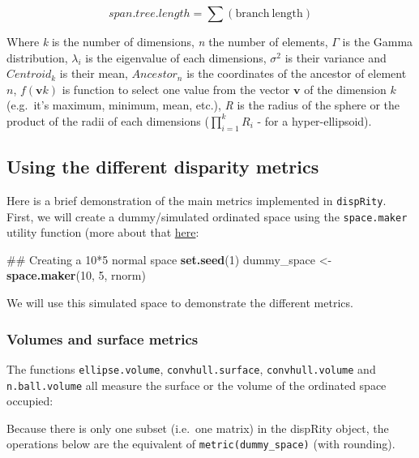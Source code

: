\documentclass[]{book}
\newenvironment{Shaded}{\begin{snugshade}}{\end{snugshade}}
\newcommand{\KeywordTok}[1]{\textcolor[rgb]{0.13,0.29,0.53}{\textbf{#1}}}
\newcommand{\DecValTok}[1]{\textcolor[rgb]{0.00,0.00,0.81}{#1}}
\newcommand{\StringTok}[1]{\textcolor[rgb]{0.31,0.60,0.02}{#1}}
\newcommand{\NormalTok}[1]{#1}
\theoremstyle{definition}
\theoremstyle{definition}
\theoremstyle{definition}
\theoremstyle{remark}
\begin{document}
\begin{equation}
    span.tree.length = \sum(\mathrm{branch\ length})
\end{equation}

Where \emph{k} is the number of dimensions, \emph{n} the number of
elements, \(\Gamma\) is the Gamma distribution, \(\lambda_i\) is the
eigenvalue of each dimensions, \(\sigma^{2}\) is their variance and
\(Centroid_{k}\) is their mean, \(Ancestor_{n}\) is the coordinates of
the ancestor of element \(n\), \(f(\mathbf{v}k)\) is function to select
one value from the vector \(\mathbf{v}\) of the dimension \(k\)
(e.g.~it's maximum, minimum, mean, etc.), \emph{R} is the radius of the
sphere or the product of the radii of each dimensions
(\(\displaystyle\prod_{i=1}^{k}R_{i}\) - for a hyper-ellipsoid).

\subsection{Using the different disparity
metrics}\label{using-the-different-disparity-metrics}

Here is a brief demonstration of the main metrics implemented in
\texttt{dispRity}. First, we will create a dummy/simulated ordinated
space using the \texttt{space.maker} utility function (more about that
\protect\hyperlink{space.maker}{here}:

\begin{Shaded}
\begin{Highlighting}[]
\NormalTok{## Creating a 10*5 normal space}
\KeywordTok{set.seed}\NormalTok{(}\DecValTok{1}\NormalTok{)}
\NormalTok{dummy_space <-}\StringTok{ }\KeywordTok{space.maker}\NormalTok{(}\DecValTok{10}\NormalTok{, }\DecValTok{5}\NormalTok{, rnorm)}
\end{Highlighting}
\end{Shaded}

We will use this simulated space to demonstrate the different metrics.

\subsubsection{Volumes and surface
metrics}\label{volumes-and-surface-metrics}

The functions \texttt{ellipse.volume}, \texttt{convhull.surface},
\texttt{convhull.volume} and \texttt{n.ball.volume} all measure the
surface or the volume of the ordinated space occupied:

Because there is only one subset (i.e.~one matrix) in the dispRity
object, the operations below are the equivalent of
\texttt{metric(dummy\_space)} (with rounding).
\end{document}
